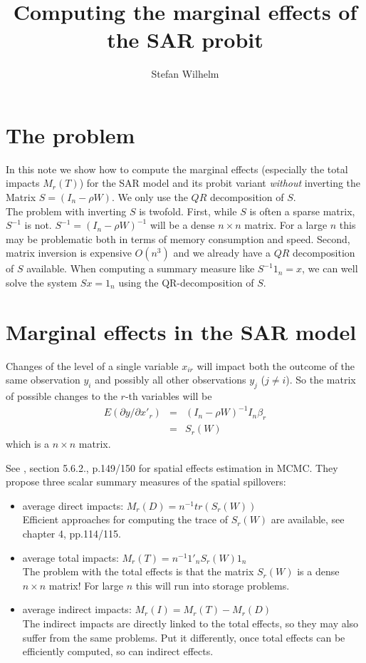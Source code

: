 \documentclass[a4paper]{article}
\title{Computing the marginal effects of the SAR probit}
\author{Stefan Wilhelm}
\begin{document}
\maketitle

\section{The problem}
In this note we show how to compute the marginal effects (especially the total impacts $M_r(T)$)
for the SAR model and its probit variant \textit{without} inverting the Matrix $S=(I_n - \rho W)$.
We only use the $QR$ decomposition of $S$.\\
The problem with inverting $S$ is twofold. 
First, while $S$ is often a sparse matrix, $S^{-1}$ is not. $S^{-1}=(I_n - \rho W)^{-1}$ will be a dense
$n \times n$ matrix. For a large $n$ this may be problematic both in terms of memory consumption and speed.
Second, matrix inversion is expensive $O(n^3)$ and we already have a $QR$ decomposition of $S$ available.
When computing a summary measure like $S^{-1} 1_n=x$, we can well solve the system $S x = 1_n$ using the QR-decomposition
of $S$.  

\section{Marginal effects in the SAR model}

Changes of the level of a single variable $x_{ir}$ will impact both the outcome of the same observation $y_i$ and possibly all other
observations $y_j$ ($j \ne i$). So the matrix of possible changes to the $r$-th variables will be
\begin{eqnarray}
E(\partial y / \partial x'_r) & = & (I_n - \rho W)^{-1} I_n \beta_r \\
                              & = & S_r(W) \nonumber
\end{eqnarray}
which is a $n \times n$ matrix.

See \cite{LeSage2009}, section 5.6.2., p.149/150 for spatial effects estimation in MCMC. They propose three scalar summary
measures of the spatial spillovers:
\begin{itemize}
\item average direct impacts: $M_r(D) = n^{-1} tr(S_r(W))$      \\
Efficient approaches for computing the trace of $S_r(W)$ are available, see \cite{LeSage2009} chapter 4, pp.114/115.
\item average total impacts: $M_r(T) = n^{-1} 1'_n S_r(W) 1_n$  \\
 The problem with the total effects is that the matrix $S_r(W)$ is a dense $n \times n$ matrix! 
 For large $n$ this will run into storage problems.
\item average indirect impacts: $M_r(I) = M_r(T) - M_r(D)$\\
 The indirect impacts are directly linked to the total effects, so they may also suffer from the same problems.
 Put it differently, once total effects can be efficiently computed, so can indirect effects.
\end{itemize}
\end{document}
